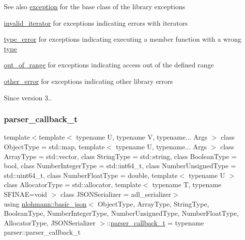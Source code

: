 \begin{DoxySeeAlso}{See also}
\mbox{\hyperlink{classnlohmann_1_1basic__json_a9a0aced019cb1d65bb49703406c84970}{exception}} for the base class of the library exceptions 

\mbox{\hyperlink{classnlohmann_1_1basic__json_ac13d32f7cbd02d616e71d8dc30dadcbf}{invalid\+\_\+iterator}} for exceptions indicating errors with iterators 

\mbox{\hyperlink{classnlohmann_1_1basic__json_a4010e8e268fefd86da773c10318f2902}{type\+\_\+error}} for exceptions indicating executing a member function with a wrong \mbox{\hyperlink{classnlohmann_1_1basic__json_a2b2d781d7f2a4ee41bc0016e931cadf7}{type}} 

\mbox{\hyperlink{classnlohmann_1_1basic__json_a28f7c2f087274a0012eb7a2333ee1580}{out\+\_\+of\+\_\+range}} for exceptions indicating access out of the defined range 

\mbox{\hyperlink{classnlohmann_1_1basic__json_a3333a5a8714912adda33a35b369f7b3d}{other\+\_\+error}} for exceptions indicating other library errors
\end{DoxySeeAlso}
\begin{DoxySince}{Since}
version 3.. 
\end{DoxySince}
\mbox{\label{classnlohmann_1_1basic__json_ab4f78c5f9fd25172eeec84482e03f5b7}} 
\subsubsection{\texorpdfstring{parser\+\_\+callback\+\_\+t}{parser\_callback\_t}}
{\footnotesize\ttfamily template$<$template$<$ typename U, typename V, typename... Args $>$ class Object\+Type = std\+::map, template$<$ typename U, typename... Args $>$ class Array\+Type = std\+::vector, class String\+Type  = std\+::string, class Boolean\+Type  = bool, class Number\+Integer\+Type  = std\+::int64\+\_\+t, class Number\+Unsigned\+Type  = std\+::uint64\+\_\+t, class Number\+Float\+Type  = double, template$<$ typename U $>$ class Allocator\+Type = std\+::allocator, template$<$ typename T, typename S\+F\+I\+N\+A\+E=void $>$ class J\+S\+O\+N\+Serializer = adl\+\_\+serializer$>$ \\
using \mbox{\hyperlink{classnlohmann_1_1basic__json}{nlohmann\+::basic\+\_\+json}}$<$ Object\+Type, Array\+Type, String\+Type, Boolean\+Type, Number\+Integer\+Type, Number\+Unsigned\+Type, Number\+Float\+Type, Allocator\+Type, J\+S\+O\+N\+Serializer $>$\+::\mbox{\hyperlink{classnlohmann_1_1basic__json_ab4f78c5f9fd25172eeec84482e03f5b7}{parser\+\_\+callback\+\_\+t}} =  typename parser\+::parser\+\_\+callback\+\_\+t}



